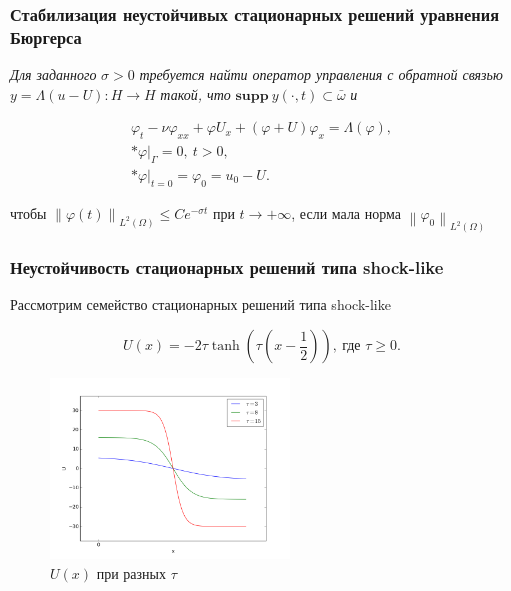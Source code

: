 \documentclass{beamer}
\newcommand{\norm}[1]{\left\lVert#1\right\rVert}
\begin{document}
\begin{frame}
\frametitle{Стабилизация неустойчивых стационарных решений уравнения Бюргерса}
\textit{Для заданного} $\sigma > 0$ 
\textit{требуется найти оператор управления с обратной связью} 
$y = \Lambda(u - U) : H \to H$ \textit{такой, что} $\mathbf{supp} \ y (\cdot,t) \subset 
\bar{\omega}$ \textit{и}

\begin{block}{}

\begin{gather}\label{fluct}
    \varphi_t - \nu \varphi_{xx} + \varphi U_x + (\varphi + U)\varphi_x =
    \Lambda(\varphi),\\* 
    \varphi|_{\Gamma} = 0, \ t > 0,\\*
    \varphi|_{t = 0} = \varphi_0 = u_0 - U.
\end{gather}
\end{block}
чтобы $\norm{\varphi(t)}_{L^2(\Omega)} \le C e^{-\sigma t}$ при $t \to
+\infty$, если мала норма $\norm{\varphi_0}_{L^2(\Omega)}$

\end{frame}

\begin{frame}
\frametitle{Неустойчивость стационарных решений типа shock-like}

Рассмотрим семейство стационарных решений типа shock-like
\begin{block}{}
\begin{equation}\label{shock_like}
    U(x) = -2\tau\tanh{(\tau(x - \frac{1}{2}))}, \ \text{где } \tau \ge 0.
\end{equation}
\end{block}

\begin{figure}[H]
    \centering
    \includegraphics[width=2.5in]{fig1}
    \caption{$U(x)$ при разных $\tau$}
\end{figure}

\end{frame}
\end{document}

